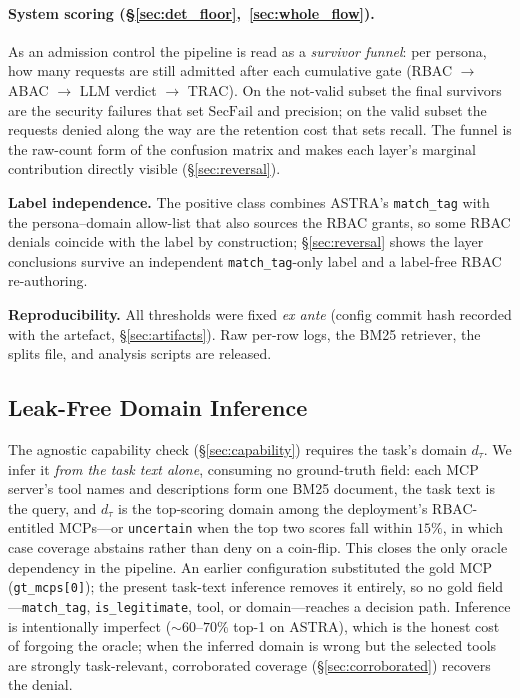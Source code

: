 \documentclass[sigconf,review,anonymous]{acmart}
\begin{document}
\paragraph{System scoring (\S\ref{sec:det_floor},~\ref{sec:whole_flow}).} As an admission control the pipeline is read as a \emph{survivor funnel}: per persona, how many requests are still admitted after each cumulative gate (RBAC $\to$ ABAC $\to$ LLM verdict $\to$ TRAC). On the not-valid subset the final survivors are the security failures that set $\mathrm{SecFail}$ and precision; on the valid subset the requests denied along the way are the retention cost that sets recall. The funnel is the raw-count form of the confusion matrix and makes each layer's marginal contribution directly visible (\S\ref{sec:reversal}).

\textbf{Label independence.} The positive class combines ASTRA's \texttt{match\_tag} with the persona--domain allow-list that also sources the RBAC grants, so some RBAC denials coincide with the label by construction; \S\ref{sec:reversal} shows the layer conclusions survive an independent \texttt{match\_tag}-only label and a label-free RBAC re-authoring.

\textbf{Reproducibility.} All thresholds were fixed \emph{ex ante} (config commit hash recorded with the artefact, \S\ref{sec:artifacts}). Raw per-row logs, the BM25 retriever, the splits file, and analysis scripts are released.

\subsection{Leak-Free Domain Inference}
\label{sec:domain_inference}

The agnostic capability check (\S\ref{sec:capability}) requires the task's domain $d_\tau$. We infer it \emph{from the task text alone}, consuming no ground-truth field: each MCP server's tool names and descriptions form one BM25 document, the task text is the query, and $d_\tau$ is the top-scoring domain among the deployment's RBAC-entitled MCPs---or \texttt{uncertain} when the top two scores fall within $15\%$, in which case coverage abstains rather than deny on a coin-flip. This closes the only oracle dependency in the pipeline. An earlier configuration substituted the gold MCP (\texttt{gt\_mcps[0]}); the present task-text inference removes it entirely, so no gold field---\texttt{match\_tag}, \texttt{is\_legitimate}, tool, or domain---reaches a decision path. Inference is intentionally imperfect ($\sim\!60$--$70\%$ top-1 on ASTRA), which is the honest cost of forgoing the oracle; when the inferred domain is wrong but the selected tools are strongly task-relevant, corroborated coverage (\S\ref{sec:corroborated}) recovers the denial.
\end{document}
